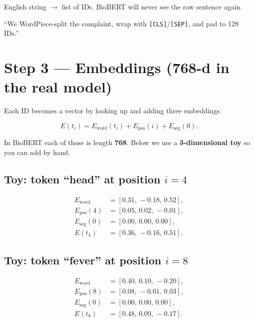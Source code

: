 \begin{stepbox}
English string \(\to\) list of IDs. BioBERT will never see the raw sentence again.
\end{stepbox}

\begin{saybox}
``We WordPiece-split the complaint, wrap with \texttt{[CLS]}/\texttt{[SEP]}, and pad to 128 IDs.''
\end{saybox}

\section{Step 3 --- Embeddings (768-d in the real model)}
\label{sec:embed}

Each ID becomes a vector by looking up and adding three embeddings:

\[
  E(t_i) = E_{\mathrm{word}}(t_i) + E_{\mathrm{pos}}(i) + E_{\mathrm{seg}}(0).
\]

In BioBERT each of those is length \textbf{768}. Below we use a \textbf{3-dimensional toy} so you can add by hand.

\subsection*{Toy: token ``head'' at position \(i=4\)}

\begin{align*}
  E_{\mathrm{word}} &= [0.31,\,-0.18,\,0.52], \\
  E_{\mathrm{pos}}(4) &= [0.05,\,0.02,\,-0.01], \\
  E_{\mathrm{seg}}(0) &= [0.00,\,0.00,\,0.00], \\
  E(t_4) &= [0.36,\,-0.16,\,0.51].
\end{align*}

\subsection*{Toy: token ``fever'' at position \(i=8\)}

\begin{align*}
  E_{\mathrm{word}} &= [0.40,\,0.10,\,-0.20], \\
  E_{\mathrm{pos}}(8) &= [0.08,\,-0.01,\,0.03], \\
  E_{\mathrm{seg}}(0) &= [0.00,\,0.00,\,0.00], \\
  E(t_8) &= [0.48,\,0.09,\,-0.17].
\end{align*}

